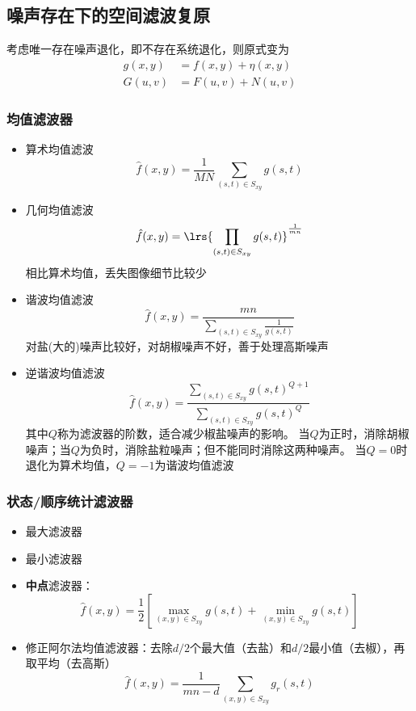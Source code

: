 \subsection{噪声存在下的空间滤波复原}
考虑唯一存在噪声退化，即不存在系统退化，则原式变为
\[\begin{aligned}
g(x,y)&=f(x,y)+\eta(x,y)\\
G(u,v)&=F(u,v)+N(u,v)
\end{aligned}\]

\subsubsection{均值滤波器}
\begin{itemize}
	\item 算术均值滤波
	\[\hat{f}(x,y)=\frac{1}{MN}\sum_{(s,t)\in S_{xy}}g(s,t)\]
	\item 几何均值滤波
	\[\hat{f}(x,y)=\lrs{\prod_{(s,t)\in S_{xy}}g(s,t)}^{\frac{1}{mn}}\]
	相比算术均值，丢失图像细节比较少
	\item 谐波均值滤波
	\[\hat{f}(x,y)=\frac{mn}{\sum_{(s,t)\in S_{xy}}\frac{1}{g(s,t)}}\]
	对盐(大的)噪声比较好，对胡椒噪声不好，善于处理高斯噪声
	\item 逆谐波均值滤波
	\[\hat{f}(x,y)=\frac{\sum_{(s,t)\in S_{xy}}g(s,t)^{Q+1}}{\sum_{(s,t)\in S_{xy}}g(s,t)^Q}\]
	其中$Q$称为滤波器的阶数，适合减少椒盐噪声的影响。
	当$Q$为正时，消除胡椒噪声；当$Q$为负时，消除盐粒噪声；但不能同时消除这两种噪声。
	当$Q=0$时退化为算术均值，$Q=-1$为谐波均值滤波
\end{itemize}

\subsubsection{状态/顺序统计滤波器}
\begin{itemize}
	\item 最大滤波器
	\item 最小滤波器
	\item \textbf{中点}滤波器：
	\[\hat{f}(x,y)=\frac{1}{2}[\max_{(x,y)\in S_{xy}}g(s,t)+\min_{(x,y)\in S_{xy}}g(s,t)]\]
	\item 修正阿尔法均值滤波器：去除$d/2$个最大值（去盐）和$d/2$最小值（去椒），再取平均（去高斯）
	\[\hat{f}(x,y)=\frac{1}{mn-d}\sum_{(x,y)\in S_{xy}}g_r(s,t)\]
\end{itemize}

